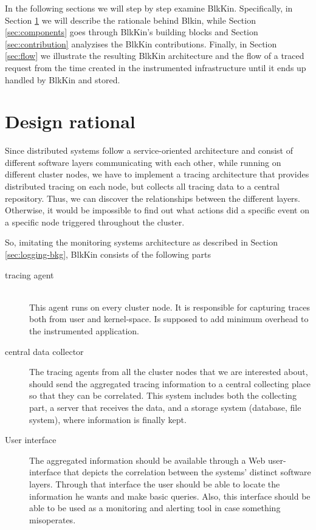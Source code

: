 In the following sections we will step by step examine BlkKin. Specifically, in
Section \ref{sec:rationale} we will describe the rationale behind Blkin, while
Section \ref{sec:components} goes through BlkKin's building blocks and Section
\ref{sec:contribution} analyzises the BlkKin contributions. Finally, in Section
\ref{sec:flow} we illustrate the resulting BlkKin architecture and the flow of a
traced request from the time created in the instrumented infrastructure until it
ends up handled by BlkKin and stored.

\section{Design rational}\label{sec:rationale}

Since distributed systems follow a service-oriented architecture and consist of
different software layers communicating with each other, while running on
different cluster nodes, we have to implement a tracing architecture that
provides distributed tracing on each node, but collects all tracing data to a
central repository. Thus, we can discover the relationships between the
different layers. Otherwise, it would be impossible to find out what actions did
a specific event on a specific node triggered throughout the cluster.

So, imitating the monitoring systems architecture as described in Section
\ref{sec:logging-bkg}, BlkKin consists of the following parts

\begin{description}
\item[tracing agent] \hfill \\
This agent runs on every cluster node. It is responsible for capturing traces
both from user and kernel-space. Is supposed to add minimum overhead to the
instrumented application.

\item[central data collector]
The tracing agents from all the cluster nodes that we are interested about,
should send the aggregated tracing information to a central collecting place so
that they can be correlated. This system includes both the collecting part, a
server that receives the data, and a storage system (database, file system),
where information is finally kept.

\item[User interface]
The aggregated information should be available through a Web user-interface that
depicts the correlation between the systems' distinct software layers. Through
that interface the user should be able to locate the information he wants and
make basic queries. Also, this interface should be able to be used as a
monitoring and alerting tool in case something misoperates.

\end{description}

